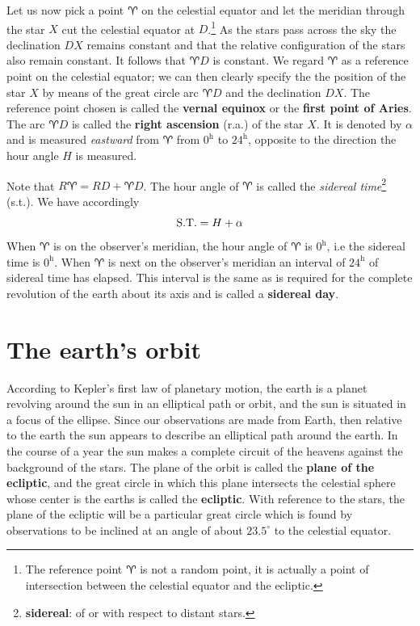 Let us now pick a point $\aries$ on the celestial equator and let the
meridian through the star $X$ cut the celestial equator at $D$.\footnote{The reference
point $\aries$ is not a random point, it is actually a point of intersection between the
celestial equator and the ecliptic.} As the
stars pass across the sky the declination $DX$ remains constant and
that the relative configuration of the stars also remain constant. It
follows that $\aries D$ is constant. We regard $\aries$ as a reference
point on the celestial equator; we can then clearly specify the the
position of the star $X$ by means of the great circle arc $\aries D$
and the declination $DX$. The reference point chosen is called the
{\bf vernal equinox} or the {\bf first point of Aries}. The arc
$\aries D$ is called the {\bf right ascension} ({\sc r.a.}) of the
star $X$. It is denoted by $\alpha$ and is measured {\it eastward}
from $\aries$ from $0^{\mathrm{h}}$ to $24^{\mathrm{h}}$, opposite to the direction the hour
angle $H$ is measured. 

Note that $R\aries =RD+\aries D$. The hour angle of $\aries$ is called
the {\it sidereal time}\footnote{{\bf sidereal}: of or with respect to distant stars.} 
 ({\sc s.t.}). We have accordingly 
\[
{\rm S.T.}=H+\alpha
\]
When $\aries$ is on the observer's meridian, the hour angle of
$\aries$ is $0^{\mathrm{h}}$, i.e the sidereal time is $0^{\mathrm{h}}$. When $\aries$
is next on the observer's meridian an interval of $24^{\mathrm{h}}$ of sidereal
time has elapsed. This interval is the same as is required for the
complete revolution of the earth about its axis and is called a {\bf
  sidereal day}. 

\section{The earth's orbit}

According to Kepler's first law of planetary motion, the earth is a 
planet revolving around the sun in an elliptical path or orbit, and
the sun is situated in a focus of the ellipse. Since our observations
are made from Earth, then relative to the earth the sun appears to
describe an elliptical path around the earth. In the course of a year
the sun makes a complete circuit of the heavens against the background
of the stars. The plane of the orbit is called the {\bf plane of the
  ecliptic},  and the great circle in which this plane intersects the
celestial sphere whose center is the earths is called the 
{\bf ecliptic}. With reference to the stars, the plane of the ecliptic
will be a particular great circle which is found by observations to be
inclined at an angle of about $23.5^\circ$ to the celestial
equator. 

